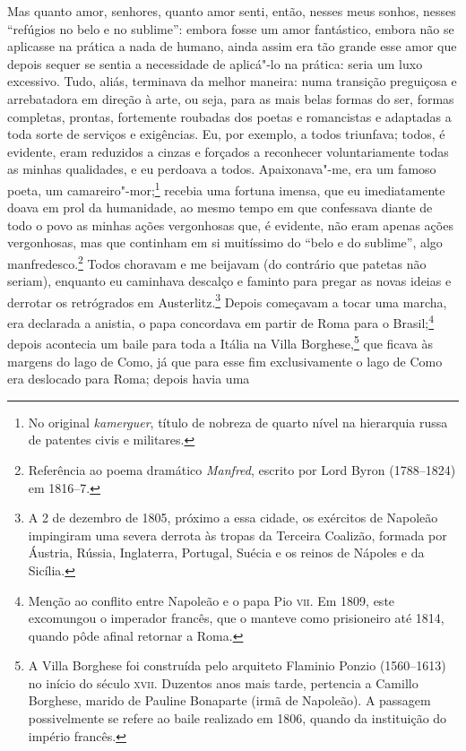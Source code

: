 Mas quanto amor, senhores, quanto amor senti, então, nesses meus sonhos,
nesses “refúgios no belo e no sublime”: embora fosse um amor
fantástico, embora não se aplicasse na prática a nada de humano, ainda
assim era tão grande esse amor que depois sequer se sentia a
necessidade de aplicá"-lo na prática: seria um luxo excessivo. Tudo,
aliás, terminava da melhor maneira: numa transição preguiçosa e
arrebatadora em direção à arte, ou seja, para as mais belas formas do
ser, formas completas, prontas, fortemente roubadas dos poetas e
romancistas e adaptadas a toda sorte de serviços e exigências. Eu, por
exemplo, a todos triunfava; todos, é evidente, eram reduzidos a cinzas
e forçados a reconhecer voluntariamente todas as minhas qualidades, e
eu perdoava a todos. Apaixonava"-me, era um famoso poeta, um
camareiro"-mor;\footnote{ No original \textit{kamerguer}, título de
nobreza de quarto nível na hierarquia russa de patentes civis e militares.}
recebia uma fortuna imensa, que eu imediatamente doava em prol da
humanidade, ao mesmo tempo em que confessava diante de todo o povo as
minhas ações vergonhosas que, é evidente, não eram apenas ações
vergonhosas, mas que continham em si muitíssimo do “belo e do sublime”,
algo manfredesco.\footnote{ Referência ao poema dramático
\textit{Manfred}, escrito por Lord Byron (1788--1824) em 1816--7.} Todos
choravam e me beijavam (do contrário que patetas não seriam), enquanto
eu caminhava descalço e faminto para pregar as novas ideias e derrotar
os retrógrados em Austerlitz.\footnote{ A 2 de dezembro de 1805,
próximo a essa cidade, os exércitos de Napoleão impingiram uma
severa derrota às tropas da Terceira Coalizão, formada por Áustria,
Rússia, Inglaterra, Portugal, Suécia e os reinos de Nápoles e da
Sicília.} Depois começavam a tocar uma marcha, era declarada a anistia,
o papa concordava em partir de Roma para o Brasil;\footnote{ Menção ao
conflito entre Napoleão e o papa Pio \textsc{vii}. Em 1809, este excomungou o
imperador francês, que o manteve como prisioneiro até 1814, quando pôde
afinal retornar a Roma.} depois acontecia um baile para toda a Itália
na Villa Borghese,\footnote{ A Villa Borghese foi construída pelo
arquiteto Flaminio Ponzio (1560--1613) no início do século \textsc{xvii}.
Duzentos anos mais tarde, pertencia a Camillo Borghese, marido de
Pauline Bonaparte (irmã de Napoleão). A passagem possivelmente se
refere ao baile realizado em 1806, quando da instituição do império
francês.} que ficava às margens do lago de Como, já que para esse fim
exclusivamente o lago de Como era deslocado para Roma; depois havia uma
